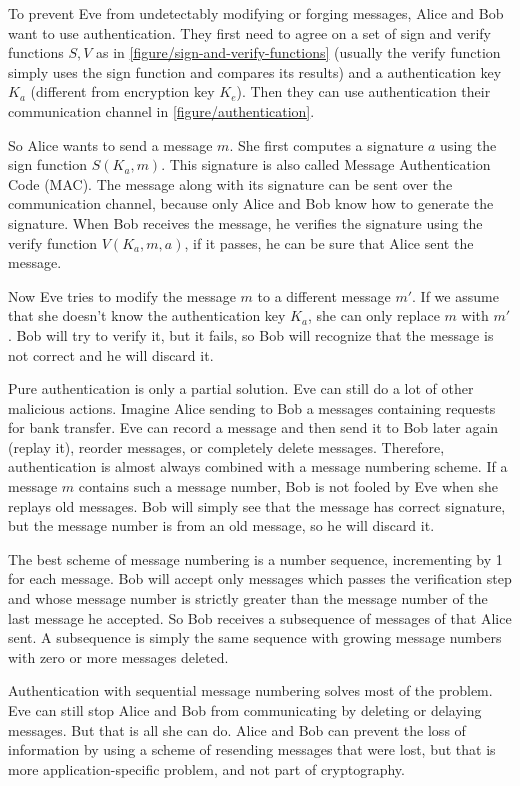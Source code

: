 To prevent Eve from undetectably modifying or forging messages, Alice and Bob want to use authentication. They first need to agree on a set of sign and verify functions $S, V$ as in \autoref{figure/sign-and-verify-functions} (usually the verify function simply uses the sign function and compares its results) and a authentication key $K_a$ (different from encryption key $K_e$). Then they can use authentication their communication channel in \autoref{figure/authentication}.

So Alice wants to send a message $m$. She first computes a signature $a$ using the sign function $S(K_a, m)$. This signature is also called Message Authentication Code (MAC). The message along with its signature can be sent over the communication channel, because only Alice and Bob know how to generate the signature. When Bob receives the message, he verifies the signature using the verify function $V(K_a, m, a)$, if it passes, he can be sure that Alice sent the message.

Now Eve tries to modify the message $m$ to a different message $m'$. If we assume that she doesn't know the authentication key $K_a$, she can only replace $m$ with $m'$. Bob will try to verify it, but it fails, so Bob will recognize that the message is not correct and he will discard it.

Pure authentication is only a partial solution. Eve can still do a lot of other malicious actions. Imagine Alice sending to Bob a messages containing requests for bank transfer. Eve can record a message and then send it to Bob later again (replay it), reorder messages, or completely delete messages. Therefore, authentication is almost always combined with a message numbering scheme. If a message $m$ contains such a message number, Bob is not fooled by Eve when she replays old messages. Bob will simply see that the message has correct signature, but the message number is from an old message, so he will discard it.

The best scheme of message numbering is a number sequence, incrementing by 1 for each message. Bob will accept only messages which passes the verification step and whose message number is strictly greater than the message number of the last message he accepted. So Bob receives a subsequence of messages of that Alice sent. A subsequence is simply the same sequence with growing message numbers with zero or more messages deleted.

Authentication with sequential message numbering solves most of the problem. Eve can still stop Alice and Bob from communicating by deleting or delaying messages. But that is all she can do. Alice and Bob can prevent the loss of information by using a scheme of resending messages that were lost, but that is more application-specific problem, and not part of cryptography.

